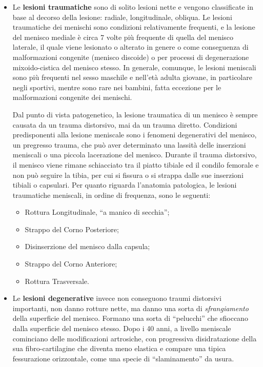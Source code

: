 \begin{itemize}
\item
  Le \textbf{lesioni traumatiche} sono di solito lesioni nette e vengono classificate in base al decorso della lesione: radiale, longitudinale, obliqua.
Le lesioni traumatiche dei menischi sono condizioni relativamente frequenti, e la lesione del menisco mediale è circa 7 volte più frequente di quella del menisco laterale, il quale viene lesionato o alterato in genere o come conseguenza di malformazioni congenite (menisco discoide) o per processi di degenerazione mixoido-cistica del menisco stesso. In generale, comunque, le lesioni meniscali sono più frequenti nel sesso maschile e nell'età adulta giovane, in particolare
negli sportivi, mentre sono rare nei bambini, fatta eccezione per le malformazioni congenite dei menischi.

Dal punto di vista patogenetico, la lesione traumatica di un menisco è sempre causata da un trauma distorsivo, mai da un trauma diretto.
Condizioni predisponenti alla lesione meniscale sono i fenomeni degenerativi del menisco, un pregresso trauma, che può aver determinato una lassità delle inserzioni meniscali o una piccola lacerazione del menisco. Durante il trauma distorsivo, il menisco viene rimane schiacciato tra il piatto tibiale ed il condilo femorale e non può seguire la tibia, per cui si fissura o si strappa dalle sue inserzioni tibiali o capsulari. Per quanto riguarda l'anatomia patologica, le lesioni traumatiche meniscali, in ordine di frequenza, sono le seguenti:

\begin{itemize}
\item
  Rottura Longitudinale, ``a manico di secchia'';
\item
  Strappo del Corno Posteriore;
\item
  Disinserzione del menisco dalla capsula;
\item
  Strappo del Corno Anteriore;
\item
  Rottura Trasversale.
\end{itemize}

\item
  Le \textbf{lesioni degenerative} invece non conseguono traumi distorsivi importanti, non danno rotture nette, ma danno una sorta di \emph{sfrangiamento} della superficie del menisco. Formano una sorta di ``pelucchi'' che sfioccano dalla superficie del menisco stesso. Dopo i 40 anni, a livello meniscale cominciano delle modificazioni artrosiche, con progressiva disidratazione della sua fibro-cartilagine che diventa meno elastica e compare una tipica fessurazione orizzontale, come una specie di ``slaminamento'' da usura.
\end{itemize}

